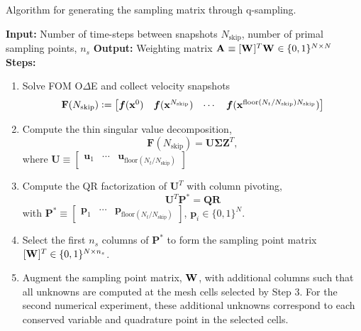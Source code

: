 \documentclass[3p,computermodern,10pt]{elsarticle}
\begin{document}
\begin{appendices}
\begin{algorithm}
\caption{Algorithm for generating the sampling matrix through q-sampling.}
\label{alg:qdeim}
\textbf{Input:} Number of time-steps between snapshots $N_{\text{skip}}$, number of primal sampling points, $n_s$ \; 
\textbf{Output:} Weighting matrix $\mathbf{A}^{} \equiv [\mathbf{W}^{}]^T \mathbf{W}^{} \in \{0,1\}^{N \times N}$ \;
\textbf{Steps:}
\begin{enumerate}
    \item Solve FOM O$\Delta$E and collect velocity snapshots 
$$\mathbf{F}(N_{\text{skip}}) \vcentcolon= \begin{bmatrix} \boldsymbol f ({\mathbf{x}}^{0})  & \boldsymbol f( {\mathbf{x}}^{N_{\text{skip}}}) & \cdots & \boldsymbol f( {\mathbf{x}}^{\text{floor}(N_t/N_{\text{skip}})N_{\text{skip}}} ) \end{bmatrix}$$
    \item Compute the thin singular value decomposition, $$\mathbf{F} (N_{\text{skip}}) = \mathbf{U \Sigma Z}^T,$$
    where $\mathbf{U} \equiv \begin{bmatrix} \mathbf{u}_1 & \cdots & \mathbf{u}_{\text{floor}(N_t/N_{\text{skip}})}\end{bmatrix}$
    \item Compute the QR factorization of  $\mathbf{U}^T$ with column pivoting,
    \begin{equation*}
        \mathbf{U}^T \mathbf{P}^* = \mathbf{QR}
    \end{equation*}
    with $\mathbf{P}^* \equiv \begin{bmatrix} \mathbf{p}_1 & \cdots & \mathbf{p}_{\text{floor}(N_t/N_{\text{skip}})} \end{bmatrix}$, $\mathbf{p}_i \in \{0,1\}^N$. 
    \item Select the first $n_s$ columns of $\mathbf{P}^*$ to form the sampling point matrix $[\mathbf{W}^{}]^T \in \{0,1\}^{N \times n_s}$. 
    \item Augment the sampling point matrix, $\mathbf{W}^{}$, with additional columns such that all unknowns are computed at the mesh cells selected by Step 3. For the second numerical experiment, these additional unknowns correspond to each conserved variable and quadrature point in the selected cells. 
\end{enumerate}


\end{algorithm}




\end{appendices}
\end{document}
